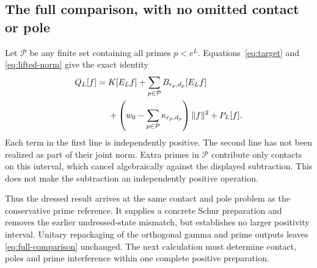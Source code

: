 \subsection{The full comparison, with no omitted contact or pole}
Let $\mathcal P$ be any finite set containing all primes $p<e^L$.
Equations~\eqref{eq:target} and \eqref{eq:lifted-norm} give the exact
identity
\begin{align}
 Q_L[f]={}&K[E_Lf]+\sum_{p\in\mathcal P}B_{r_p,d_p}[E_Lf]
 \notag\\
 &+\left(w_0-\sum_{p\in\mathcal P}\kappa_{r_p,d_p}\right)\lVert f\rVert^2
 +P_L[f].
 \label{eq:full-comparison}
\end{align}
Each term in the first line is independently positive. The second
line has not been realized as part of their joint norm. Extra primes
in $\mathcal P$ contribute only contacts on this interval, which
cancel algebraically against the displayed subtraction. This does
not make the subtraction an independently positive operation.

Thus the dressed result arrives at the same contact and pole problem
as the conservative prime reference. It supplies a concrete Schur
preparation and removes the earlier undressed-state mismatch, but
establishes no larger positivity interval. Unitary repackaging of the
orthogonal gamma and prime outputs leaves \eqref{eq:full-comparison}
unchanged. The next calculation must determine contact, poles and
prime interference within one complete positive preparation.
